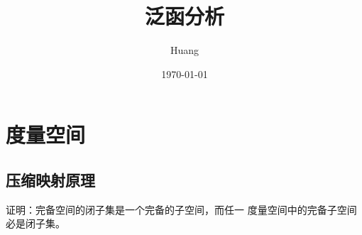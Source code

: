 \documentclass[lang=cn,10pt]{elegantbook}
\title{泛函分析}
\author{ Huang}
\date{\today}
\begin{document}
	
	\maketitle
	\frontmatter
	
	\tableofcontents
	
	\mainmatter
	\chapter{度量空间}
	\section{压缩映射原理}
	\begin{exercise}
		证明：完备空间的闭子集是一个完备的子空间，而任一
		度量空间中的完备子空间必是闭子集。
	\end{exercise}
	
\end{document}
